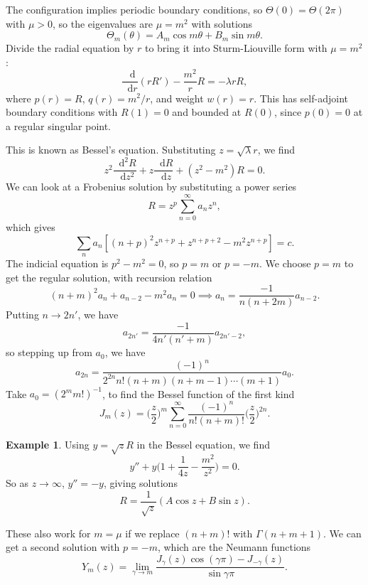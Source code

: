 \documentclass[12pt]{article}
\newcommand{\diff}{\mathop{}\!\mathrm{d}}
\newcommand{\Diff}[1]{\mathop{}\!\mathrm{d}^{#1}}
\theoremstyle{definition}
\newtheorem{example}{Example}[section]
\theoremstyle{remark}
\begin{document}
The configuration implies periodic boundary conditions, so $\Theta(0) = \Theta(2 \pi)$ with $\mu > 0$, so the eigenvalues are $\mu = m^2$ with solutions
\[
	\Theta_m(\theta) = A_m \cos m \theta + B_m \sin m \theta
.\]
Divide the radial equation by $r$ to bring it into Sturm-Liouville form with $\mu = m^2$:
\[
	\frac{\diff}{\diff r} (r R') - \frac{m^2}{r}R = - \lambda r R
,\]
where $p(r) = R$, $q(r) = m^2/r$, and weight $w(r) = r$. This has self-adjoint boundary conditions with $R(1) = 0$ and bounded at $R(0)$, since $p(0) = 0$ at a regular singular point.

This is known as Bessel's equation. Substituting $z = \sqrt{\lambda} r$, we find
\[
	z^2 \frac{\Diff2 R}{\diff z^2} + z \frac{\diff R}{\diff z} + (z^2 - m^2)R = 0
.\]
We can look at a Frobenius solution by substituting a power series
\[
R = z^{p} \sum_{n = 0}^{\infty} a_n z^{n}
,\]
which gives
\[
	\sum_{n} a_n[(n+p)^2 z^{n+p} + z^{n + p + 2} - m^2z^{n+p}] = c
.\]
The indicial equation is $p^2 - m^2 = 0$, so $p = m$ or $p = -m$. We choose $p = m$ to get the regular solution, with recursion relation
\[
	(n + m)^2 a_n + a_{n-2} - m^2a_n = 0 \implies a_n = \frac{-1}{n(n+2m)}a_{n-2}
.\]
Putting $n \to 2n'$, we have
\[
	a_{2n'} = \frac{-1}{4n'(n' + m)}a_{2n'-2}
,\]
so stepping up from $a_0$, we have
\[
	a_{2n} = \frac{(-1)^{n}}{2^{2n}n!(n+m)(n+m-1)\cdots(m+1)}a_0
.\]
Take $a_0 = (2^{m}m!)^{-1}$, to find the Bessel function of the first kind
\[
	J_m(z) = \biggl(\frac{z}{2}\biggr)^{m} \sum_{n = 0}^{\infty} \frac{(-1)^{n}}{n!(n+m)!} \biggl( \frac{z}{2} \biggr)^{2n}
.\]

\begin{adjustbox}{minipage = \columnwidth - 25.5pt, margin=1em, frame=1pt, margin=0em}
\begin{example}
	Using $y = \sqrt z R$ in the Bessel equation, we find
	\[
		y'' + y \biggl( 1 + \frac{1}{4z} - \frac{m^2}{z^2} \biggr) = 0
	.\]
	So as $z \to \infty$, $y'' = -y$, giving solutions
	\[
		R = \frac{1}{\sqrt z}(A \cos z + B \sin z)
	.\]
\end{example}
\end{adjustbox}

These also work for $m = \mu$ if we replace $(n+m)!$ with $\Gamma(n+m+1)$. We can get a second solution with $p = -m$, which are the Neumann functions
\[
	Y_m(z) = \lim_{\gamma \to m} \frac{J_{\gamma}(z) \cos (\gamma \pi) - J_{-\gamma}(z)}{\sin \gamma \pi}
.\]
\end{document}
